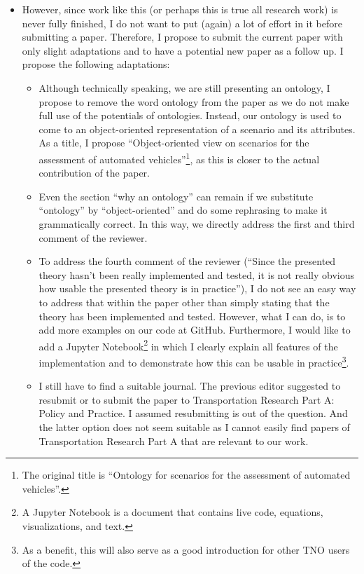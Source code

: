 \documentclass[10pt,final,a4paper,oneside,onecolumn]{article}
\begin{document}
\begin{itemize}
\begin{itemize}
		\item However, since work like this (or perhaps this is true all research work) is never fully finished, I do not want to put (again) a lot of effort in it before submitting a paper. Therefore, I propose to submit the current paper with only slight adaptations and to have a potential new paper as a follow up. I propose the following adaptations:
		\begin{itemize}
			\item Although technically speaking, we are still presenting an ontology, I propose to remove the word ontology from the paper as we do not make full use of the potentials of ontologies. Instead, our ontology is used to come to an object-oriented representation of a scenario and its attributes. As a title, I propose ``Object-oriented view on scenarios for the assessment of automated vehicles''\footnote{The original title is ``Ontology for scenarios for the assessment of automated vehicles''.}, as this is closer to the actual contribution of the paper.
			
			\item Even the section ``why an ontology'' can remain if we substitute ``ontology'' by ``object-oriented'' and do some rephrasing to make it grammatically correct. In this way, we directly address the first and third comment of the reviewer.
			
			\item To address the fourth comment of the reviewer (``Since the presented theory hasn't been really implemented and tested, it is not really obvious how usable the presented theory is in practice''), I do not see an easy way to address that within the paper other than simply stating that the theory has been implemented and tested. However, what I can do, is to add more examples on our code at GitHub. Furthermore, I would like to add a Jupyter Notebook\footnote{A Jupyter Notebook is a document that contains live code, equations, visualizations, and text.} in which I clearly explain all features of the implementation and to demonstrate how this can be usable in practice\footnote{As a benefit, this will also serve as a good introduction for other TNO users of the code.}.
			
			\item I still have to find a suitable journal. The previous editor suggested to resubmit or to submit the paper to Transportation Research Part A: Policy and Practice. I assumed resubmitting is out of the question. And the latter option does not seem suitable as I cannot easily find papers of Transportation Research Part A that are relevant to our work.
		\end{itemize}
	\end{itemize}


\end{itemize}
\end{document}
